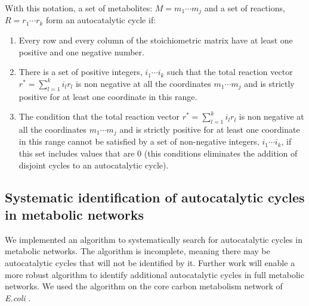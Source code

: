 With this notation, a set of metabolites: $M={m_1\cdots m_j}$ and a set of reactions, $R={r_1\cdots r_k}$ form an autocatalytic cycle if:
\begin{enumerate}
    \item Every row and every column of the stoichiometric matrix have at least one positive and one negative number.
    \item There is a set of positive integers, $i_1\cdots i_k$ such that the total reaction vector $r^*=\sum_{l=1}^k i_lr_l$ is non negative at all the coordinates $m_1\cdots m_j$ and is strictly positive for at least one coordinate in this range.
    \item The condition that the total reaction vector $r^*=\sum_{l=1}^k i_lr_l$ is non negative at all the coordinates $m_1\cdots m_j$ and is strictly positive for at least one coordinate in this range cannot be satisfied by a set of non-negative integers, $i_1\cdots i_k$, if this set includes values that are $0$ (this conditions eliminates the addition of disjoint cycles to an autocatalytic cycle).
\end{enumerate}

  \subsection{Systematic identification of autocatalytic cycles in metabolic networks}
  We implemented an algorithm to systematically search for autocatalytic cycles in metabolic networks.
  The algorithm is incomplete, meaning there may be autocatalytic cycles that will not be identified by it.
  Further work will enable a more robust algorithm to identify additional autocatalytic cycles in full metabolic networks.
  We used the algorithm on the core carbon metabolism network of \emph{E.coli} \cite{Orth2010-vl}.

